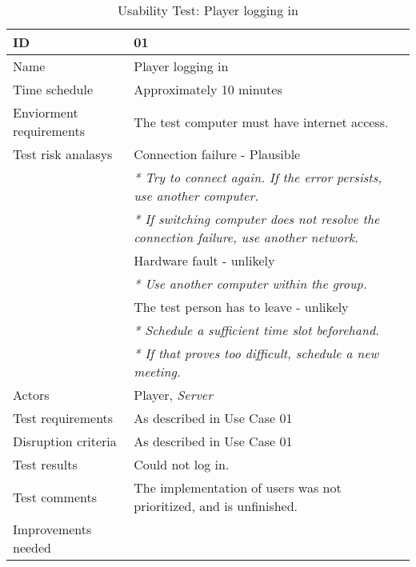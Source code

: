 
{\footnotesize
\begin{table}[H]
\begin{tabular}{| p{5cm} | p{10cm} |}\hline
	\textbf{ID}	& \textbf{01} \\ \hline
	Name		& Player logging in\\ \hline
	Time schedule	& Approximately 10 minutes\\ \hline
	Enviorment requirements 
		& The test computer must have internet access. \\ \hline
	Test risk analasys 
		& Connection failure - Plausible \\
		& \emph{* Try to connect again. If the error persists, use another computer.} \\
		& \emph{* If switching computer does not resolve the connection failure, use another network.}\\
		& Hardware fault - unlikely \\
		& \emph{* Use another computer within the group.} \\
		& The test person has to leave - unlikely \\
		& \emph{* Schedule a sufficient time slot beforehand.} \\
		& \emph{* If that proves too difficult, schedule a new meeting.}\\ \hline
	Actors	& Player, \emph{Server}\\ \hline
	Test requirements & As described in Use Case 01 \\ \hline
	Disruption criteria & As described in Use Case 01  \\ \hline
	Test results & Could not log in.
		& \\ \hline
	Test comments & The implementation of users was not prioritized, and is unfinished.
		& \\ \hline
	Improvements needed
		& \\ \hline
\end{tabular}


\caption{Usability Test: Player logging in}
\label{fig:usability_test_1}
\end{table}}


